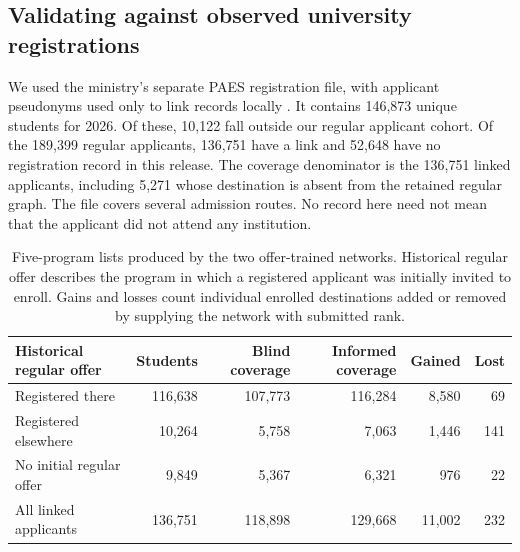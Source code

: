 \subsection{Validating against observed university registrations}\label{app:enroll}
We used the ministry's separate PAES registration file, with applicant pseudonyms used only to link records locally \citep{paes}. It contains 146,873 unique students for 2026. Of these, 10,122 fall outside our regular applicant cohort. Of the 189,399 regular applicants, 136,751 have a link and 52,648 have no registration record in this release. The coverage denominator is the 136,751 linked applicants, including 5,271 whose destination is absent from the retained regular graph. The file covers several admission routes. No record here need not mean that the applicant did not attend any institution.

\begin{table}[ht]\centering\small
\caption{Five-program lists produced by the two offer-trained networks. Historical regular offer describes the program in which a registered applicant was initially invited to enroll. Gains and losses count individual enrolled destinations added or removed by supplying the network with submitted rank.}
\label{tab:enroll}\begin{tabular}{@{}lrrrrr@{}}\toprule
Historical regular offer & Students & Blind coverage & Informed coverage & Gained & Lost\\\midrule
Registered there & 116,638 & 107,773 & 116,284 & 8,580 & 69\\
Registered elsewhere & 10,264 & 5,758 & 7,063 & 1,446 & 141\\
No initial regular offer & 9,849 & 5,367 & 6,321 & 976 & 22\\\midrule
All linked applicants & 136,751 & 118,898 & 129,668 & 11,002 & 232\\\bottomrule
\end{tabular}\end{table}

